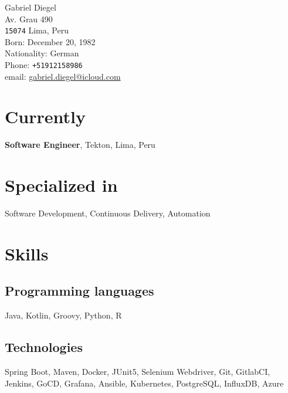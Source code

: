 \documentclass[10pt, a4paper]{article}
\begin{document}
{\LARGE Gabriel Diegel}\\[1cm]
Av. Grau 490\\
\texttt{15074} Lima, Peru\\[.2cm]
Born: December 20, 1982\\
Nationality: German\\[.2cm]
Phone: \texttt{+51912158986}\\
email: \href{mailto:gabriel.diegel@icloud.com}{gabriel.diegel@icloud.com}\\

\section*{Currently}
{\bf Software Engineer}, Tekton, Lima, Peru

\section*{Specialized in}
Software Development, Continuous Delivery, Automation

\section*{Skills}
\subsection*{Programming languages}
Java, Kotlin, Groovy, Python, R
\subsection*{Technologies}
Spring Boot, Maven, Docker, JUnit5, Selenium Webdriver, Git, GitlabCI, Jenkins, GoCD, Grafana, Ansible, Kubernetes, PostgreSQL, InfluxDB, Azure

\end{document}

